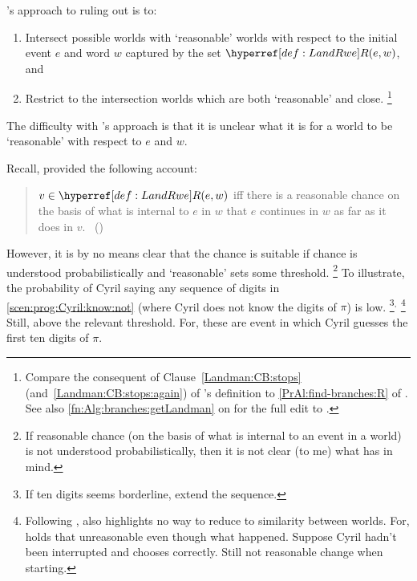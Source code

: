 \begin{note}
  \citeauthor{Landman:1992wh}'s approach to ruling out \ndrAdj{} \drift{} is to:
  \begin{enumerate}[label=\alph*., ref=(\alph*), noitemsep]
  \item
    Intersect possible worlds with `reasonable' worlds with respect to the initial event \(e\) and word \(w\) captured by the set \(\lRwe{w}{e}\), and
  \item
    Restrict \drift{} to the intersection worlds which are both `reasonable' and close.%
    \footnote{
      Compare the consequent of Clause~\ref{Landman:CB:stops} (and~\ref{Landman:CB:stops:again}) of \citeauthor{Landman:1992wh}'s definition to \autoref{PrAl:find-branches:R} of \AlgFindBranches{}.
      See also \autoref{fn:Alg:branches:getLandman} on  for the full edit to \AlgFindBranches{}.
    }
  \end{enumerate}

  The difficulty with \citeauthor{Landman:1992wh}'s approach is that it is unclear what it is for a world to be `reasonable' with respect to \(e\) and \(w\).

  Recall, \citeauthor{Landman:1992wh} provided the following account:
  \begin{quote}
    \(v \in \lRwe{w}{e}\) iff there is a reasonable chance on the basis of what is internal to \(e\) in \(w\) that \(e\) continues in \(w\) as far as it does in \(v\).%
    \mbox{ }\hfill\mbox{(\citeyear[26]{Landman:1992wh})}
  \end{quote}

  However, it is by no means clear that the chance is suitable if chance is understood probabilistically and `reasonable' sets some threshold.%
  \footnote{
    If reasonable chance (on the basis of what is internal to an event in a world) is not understood probabilistically, then it is not clear (to me) what \citeauthor{Landman:1992wh} has in mind.
  }
  To illustrate, the probability of Cyril saying any sequence of digits in \autoref{scen:prog:Cyril:know:not} (where Cyril does not know the digits of \(\pi\)) is low.%
  \footnote{
    If ten digits seems borderline, extend the sequence.
  }\(^{,}\)%
  \footnote{
    Following \citeauthor{Landman:1992wh}, also highlights no way to reduce to similarity between worlds.
    For, \citeauthor{Landman:1992wh} holds that unreasonable even though what happened.
    Suppose Cyril hadn't been interrupted and chooses correctly.
    Still not reasonable change when starting.
  }
  Still, above the relevant threshold.
  For, these are event in which Cyril guesses the first ten digits of \(\pi\).


\end{note}
